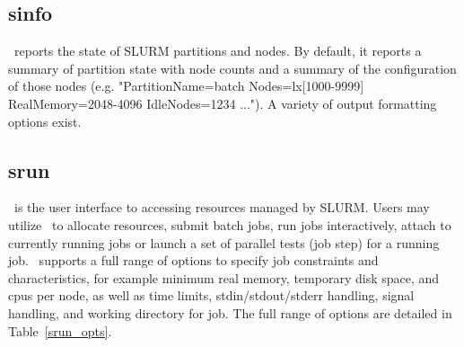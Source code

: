 \subsection{sinfo}

\sinfo\ reports the state of SLURM partitions and nodes.  By
default, it reports a summary of partition state with node counts and
a summary of the configuration of those nodes (e.g.  "PartitionName=batch
Nodes=lx[1000-9999] RealMemory=2048-4096 IdleNodes=1234 ..."). A variety 
of output formatting options exist.

\subsection{srun}

\srun\ is the user interface to accessing resources managed by SLURM.
Users may utilize \srun\ to allocate resources, submit batch jobs, 
run jobs interactively, attach to currently running jobs or launch 
a set of parallel tests (job step) for a running job. \srun\ 
supports a full range of options to specify job constraints and
characteristics, for example minimum real memory, temporary disk space,
and cpus per node, as well as time limits, stdin/stdout/stderr 
handling, signal handling, and working directory for job.
The full range of options are detailed in Table~\ref{srun_opts}.

